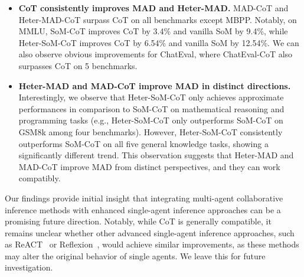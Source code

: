 \begin{itemize}
    \item \textbf{CoT consistently improves MAD and Heter-MAD.} MAD-CoT and Heter-MAD-CoT surpass CoT on all benchmarks except MBPP. Notably, on MMLU, SoM-CoT improves CoT by 3.4\% and vanilla SoM by 9.4\%, while Heter-SoM-CoT improves CoT by 6.54\% and vanilla SoM by 12.54\%. We can also observe obvious improvements for ChatEval, where ChatEval-CoT also surpasses CoT on 5 benchmarks.
    \item \textbf{Heter-MAD and MAD-CoT improve MAD in distinct directions.} Interestingly, we observe that Heter-SoM-CoT only achieves approximate performances in comparison to SoM-CoT on mathematical reasoning and programming tasks (e.g., Heter-SoM-CoT only outperforms SoM-CoT on GSM8k among four benchmarks). However, Heter-SoM-CoT consistently outperforms SoM-CoT on all five general knowledge tasks, showing a significantly different trend. This observation suggests that Heter-MAD and MAD-CoT improve MAD from distinct perspectives, and they can work compatibly.
\end{itemize}

Our findings provide initial insight that integrating multi-agent collaborative inference methods with enhanced single-agent inference approaches can be a promising future direction. Notably, while CoT is generally compatible, it remains unclear whether other advanced single-agent inference approaches, such as ReACT~\citep{yao2022react} or Reflexion~\citep{shinn2024reflexion}, would achieve similar improvements, as these methods may alter the original behavior of single agents. We leave this for future investigation.



